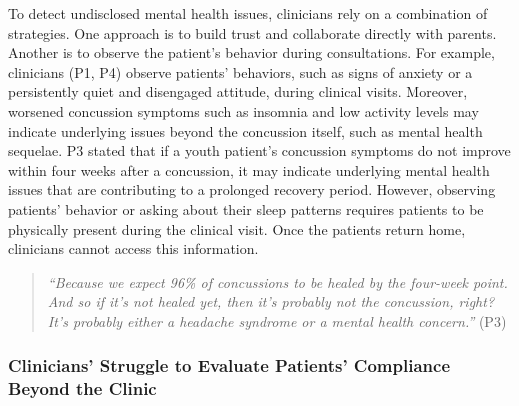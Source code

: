 To detect undisclosed mental health issues, clinicians rely on a combination of strategies.
One approach is to build trust and collaborate directly with parents. 
Another is to observe the patient’s behavior during consultations. 
For example, clinicians (P1, P4) observe patients' behaviors, such as signs of anxiety or a persistently quiet and disengaged attitude, during clinical visits. 
Moreover, worsened concussion symptoms such as insomnia and low activity levels may indicate underlying issues beyond the concussion itself, such as mental health sequelae.
P3 stated that if a youth patient's concussion symptoms do not improve within four weeks after a concussion, it may indicate underlying mental health issues that are contributing to a prolonged recovery period.
However, observing patients' behavior or asking about their sleep patterns requires patients to be physically present during the clinical visit.
Once the patients return home, clinicians cannot access this information.
\begin{quote}
    \textit{``Because we expect 96\% of concussions to be healed by the four-week point. And so if it's not healed yet, then it's probably not the concussion, right? It's probably either a headache syndrome or a mental health concern.''} (P3)
\end{quote}


\subsubsection{Clinicians’ Struggle to Evaluate Patients’ Compliance Beyond the Clinic}\label{sec:compliance}


